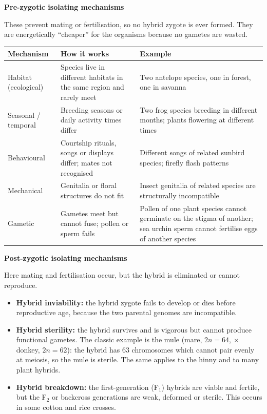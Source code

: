 \documentclass[11pt]{article}
\newcommand{\cle}[1]{{\popxbold\color{popdark}#1}}
\begin{document}
\textbf{Pre-zygotic isolating mechanisms}\par
These prevent mating or fertilisation, so no hybrid zygote is ever formed. They are energetically ``cheaper'' for the organisms because no gametes are wasted.

\begin{center}
\begin{tabularx}{\linewidth}{|l|X|X|}
\hline
\rowcolor{popblueL} \textbf{Mechanism} & \textbf{How it works} & \textbf{Example} \\
\hline
Habitat (ecological) & Species live in different habitats in the same region and rarely meet & Two antelope species, one in forest, one in savanna \\
\hline
Seasonal / temporal & Breeding seasons or daily activity times differ & Two frog species breeding in different months; plants flowering at different times \\
\hline
Behavioural & Courtship rituals, songs or displays differ; mates not recognised & Different songs of related sunbird species; firefly flash patterns \\
\hline
Mechanical & Genitalia or floral structures do not fit & Insect genitalia of related species are structurally incompatible \\
\hline
Gametic & Gametes meet but cannot fuse; pollen or sperm fails & Pollen of one plant species cannot germinate on the stigma of another; sea urchin sperm cannot fertilise eggs of another species \\
\hline
\end{tabularx}
\end{center}

\textbf{Post-zygotic isolating mechanisms}\par
Here mating and fertilisation occur, but the hybrid is eliminated or cannot reproduce.

\begin{itemize}
\item \textbf{Hybrid inviability:} the hybrid zygote fails to develop or dies before reproductive age, because the two parental genomes are incompatible.
\item \textbf{Hybrid sterility:} the hybrid survives and is vigorous but cannot produce functional gametes. The classic example is the \cle{mule} (mare, $2n = 64$, $\times$ donkey, $2n = 62$): the hybrid has 63 chromosomes which cannot pair evenly at meiosis, so the mule is sterile. The same applies to the hinny and to many plant hybrids.
\item \textbf{Hybrid breakdown:} the first-generation (F$_1$) hybrids are viable and fertile, but the F$_2$ or backcross generations are weak, deformed or sterile. This occurs in some cotton and rice crosses.
\end{itemize}
\end{document}
